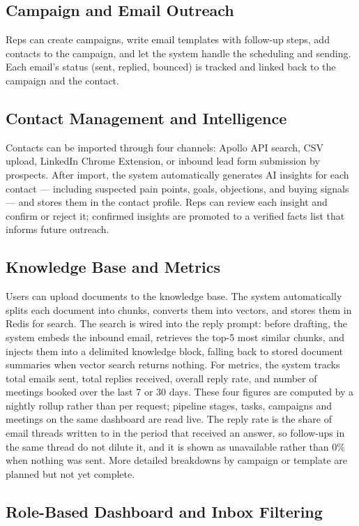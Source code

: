 \documentclass[a4paper]{article}
\begin{document}
\subsection{Campaign and Email Outreach}
Reps can create campaigns, write email templates with follow-up steps, add
contacts to the campaign, and let the system handle the scheduling and sending.
Each email's status (sent, replied, bounced) is tracked and linked back to the
campaign and the contact.

\subsection{Contact Management and Intelligence}
Contacts can be imported through four channels: Apollo API search, CSV upload,
LinkedIn Chrome Extension, or inbound lead form submission by prospects.
After import, the system automatically generates AI insights for each contact
— including suspected pain points, goals, objections, and buying signals —
and stores them in the contact profile. Reps can review each insight and
confirm or reject it; confirmed insights are promoted to a verified facts list
that informs future outreach.

\subsection{Knowledge Base and Metrics}
Users can upload documents to the knowledge base. The system automatically
splits each document into chunks, converts them into vectors, and stores them
in Redis for search. The search is wired into the reply prompt: before
drafting, the system embeds the inbound email, retrieves the top-5 most
similar chunks, and injects them into a delimited knowledge block, falling
back to stored document summaries when vector search returns nothing.
For metrics, the system tracks total emails sent, total replies received,
overall reply rate, and number of meetings booked over the last 7 or 30 days.
These four figures are computed by a nightly rollup rather than per request;
pipeline stages, tasks, campaigns and meetings on the same dashboard are read
live. The reply rate is the share of email threads written to in the period
that received an answer, so follow-ups in the same thread do not dilute it,
and it is shown as unavailable rather than 0\% when nothing was sent. More detailed breakdowns by campaign or template are
planned but not yet complete.

\subsection{Role-Based Dashboard and Inbox Filtering}
\end{document}
